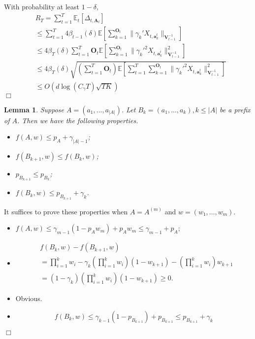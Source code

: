 \documentclass{article}
\newcommand{\EE}{\mathbb{E}}
\newcommand{\bA}{\mathbf{A}}
\newcommand{\ba}{\mathbf{a}}
\newcommand{\bO}{\mathbf{O}}
\newcommand{\bV}{\mathbf{V}}
\newcommand{\abs}[1]{\left| #1 \right|}
\newcommand{\norm}[1]{\| #1 \|}
\newtheorem{lemma}[theorem]{Lemma}%
\newenvironment{proof}{\noindent {\textbf{Proof. }}}{$\Box$ \medskip}
\begin{document}
\begin{proof}
With probability at least $1-\delta$,
\begin{equation}
\begin{split}
&R_T =\sum_{t=1}^{T} \EE_{t}[\Delta_{t, \bA_t}] \\
&\leq \sum_{t=1}^{T} 4 \beta_{t-1}(\delta) \EE[\sum_{k=1}^{\bO_t}\norm{\gamma_k' X_{t,\ba_k^t}}_{\bV_{t-1}^{-1}}]\\
&\leq 4 \beta_T(\delta) \sum_{t=1}^{T} \bO_t \EE[\sum_{k=1}^{\bO_t}\norm{\gamma_k'^2 X_{t,\ba_k^t}}_{\bV_{t-1}^{-1}}^2]\\
&\leq 4 \beta_T(\delta) \sqrt{(\sum_{t=1}^{T} \bO_t) \EE[\sum_{t=1}^{T} \sum_{k=1}^{\bO_t}\norm{\gamma_k'^2 X_{t,\ba_k^t}}_{\bV_{t-1}^{-1}}^2]}  \\
&\leq O(d\log(C_\gamma T)\sqrt{TK})
\end{split}
\end{equation}
\end{proof}


\begin{lemma}
Suppose $A = (a_1, ..., a_{\abs{A}})$. Let $B_k = (a_1, ..., a_k), k \leq \abs{A}$ be a prefix of $A$. Then we have the following properties.
\begin{itemize}
\item[(1)] $f(A, w) \leq p_A + \gamma_{\abs{A} - 1}$;
\item[(2)] $f(B_{k+1}, w) \leq f(B_k, w)$;
\item[(3)] $p_{B_{k+1}} \leq p_{B_k}$;
\item[(4)] $f(B_k, w) \leq p_{B_{k+1}} + \gamma_{k}$.
\end{itemize}	
\end{lemma}

\begin{proof}
It suffices to prove these properties when $A = A^{(m)}$ and $w = (w_1, \ldots, w_m)$.
\begin{itemize}
\item[(1)]
$f(A, w) \leq \gamma_{m-1}(1 - p_A w_m) + p_A w_m \leq \gamma_{m-1} + p_A$;

\item[(2)]
\begin{align*}
&f(B_k, w) - f(B_{k+1}, w)\\
&=\prod_{i=1}^{k}w_i - \gamma_{k} (\prod_{i=1}^{k}w_i) (1 - w_{k+1}) - (\prod_{i=1}^{k}w_i) w_{k+1}\\
&=(1 - \gamma_{k}) (\prod_{i=1}^{k}w_i) (1 - w_{k+1}) \geq 0.
\end{align*}

\item[(3)]
Obvious.

\item[(4)]
$$
f(B_k, w) \leq \gamma_{k-1} (1 - p_{B_{k+1}}) + p_{B_{k+1}}\leq p_{B_{k+1}} + \gamma_{k}
$$
\end{itemize}
\end{proof}
\end{document}
